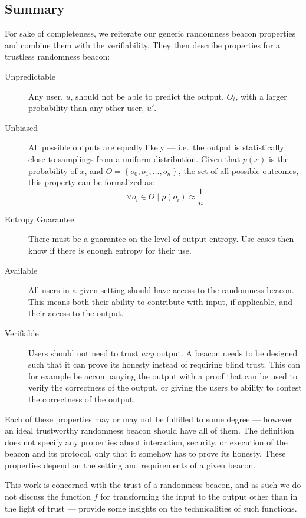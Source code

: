 \subsection{Summary}

For sake of completeness, we reiterate our generic randomness beacon properties and combine them with the verifiability.
They then describe properties for a trustless randomness beacon:

\begin{description}
    \item[Unpredictable]
        Any user, $u$, should not be able to predict the output, $O_t$, with a larger probability than any other user, $u'$.
    \item[Unbiased]
        All possible outputs are equally likely --- i.e.\ the output is statistically close to samplings from a uniform distribution.
        Given that $p(x)$ is the probability of $x$, and $O = \left\{ {o_0, o_1, \ldots, o_n} \right\}$, the set of all possible outcomes, this property can be formalized as:
        \[
            \forall o_i \in O \mid p(o_i) \approx \frac{1}{n}
        \]
    \item[Entropy Guarantee]
        There must be a guarantee on the level of output entropy.
        Use cases then know if there is enough entropy for their use.
    \item[Available]
        All users in a given setting should have access to the randomness beacon.
        This means both their ability to contribute with input, if applicable, and their access to the output.
    \item[Verifiable]
        Users should not need to trust \emph{any} output.
        A beacon needs to be designed such that it can prove its honesty instead of requiring blind trust.
        This can for example be accompanying the output with a proof that can be used to verify the correctness of the output, or giving the users to ability to contest the correctness of the output.
\end{description}

Each of these properties may or may not be fulfilled to some degree --- however an ideal trustworthy randomness beacon should have all of them.
The definition does not specify any properties about interaction, security, or execution of the beacon and its protocol, only that it somehow has to prove its honesty.
These properties depend on the setting and requirements of a given beacon.

This work is concerned with the trust of a randomness beacon, and as such we do not discuss the function $f$ for transforming the input to the output other than in the light of trust --- \citet{bonneau2015bitcoin, dodis2004randomness} provide some insights on the technicalities of such functions.
